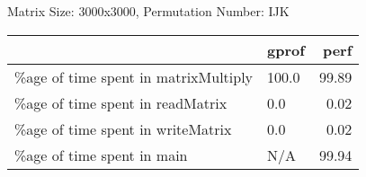 \documentclass{article}
\begin{document}
    Matrix Size: 3000x3000, Permutation Number: IJK \\
    \begin{tabular}{llr}
\hline
                                      & gprof   &   perf \\
\hline
 \%age of time spent in matrixMultiply & 100.0   &  99.89 \\
 \%age of time spent in readMatrix     & 0.0     &   0.02 \\
 \%age of time spent in writeMatrix    & 0.0     &   0.02 \\
 \%age of time spent in main           & N/A     &  99.94 \\
\hline
\end{tabular}
    
\end{document}
